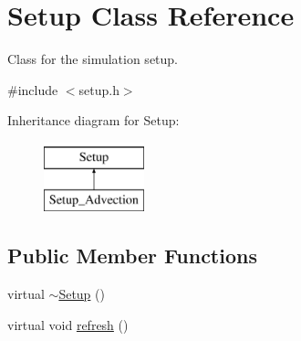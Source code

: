 \hypertarget{class_setup}{}\section{Setup Class Reference}
\label{class_setup}


Class for the simulation setup.  




{\ttfamily \#include $<$setup.\+h$>$}

Inheritance diagram for Setup\+:\begin{figure}[H]
\begin{center}
\leavevmode
\includegraphics[height=2.000000cm]{class_setup}
\end{center}
\end{figure}
\subsection*{Public Member Functions}
\begin{DoxyCompactItemize}
\item 
virtual \hyperlink{class_setup_aa402859a81d394a981849b4b9b1605a4}{$\sim$\+Setup} ()
\item 
virtual void \hyperlink{class_setup_a9f0d9baa17df8ae6876f3041788c559a}{refresh} ()
\end{DoxyCompactItemize}
